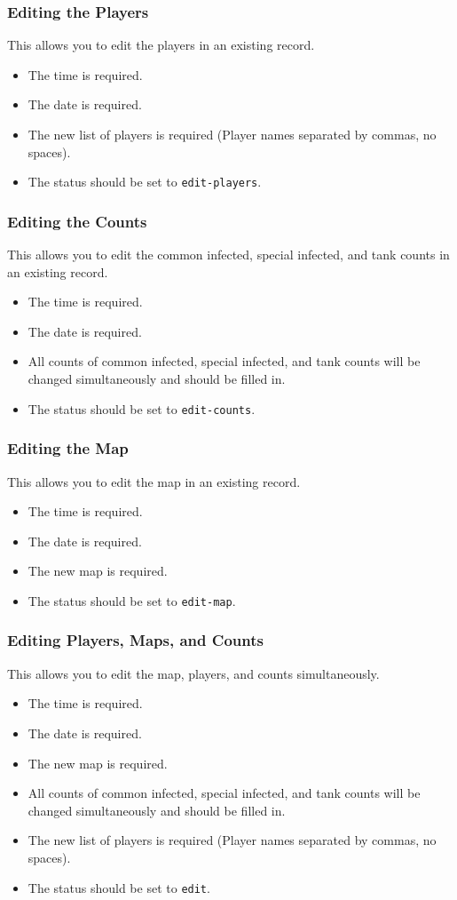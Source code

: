 \subsubsection{Editing the Players}
This allows you to edit the players in an existing record.
\begin{itemize}
\item The time is required.
\item The date is required.
\item The new list of players is required (Player names separated by commas, no spaces).
\item The status should be set to \texttt{edit-players}.
\end{itemize}

\subsubsection{Editing the Counts}
This allows you to edit the common infected, special infected, and tank counts in an existing record.
\begin{itemize}
\item The time is required.
\item The date is required.
\item All counts of common infected, special infected, and tank counts will be changed simultaneously and should be filled in.
\item The status should be set to \texttt{edit-counts}.
\end{itemize}

\subsubsection{Editing the Map}
This allows you to edit the map in an existing record.
\begin{itemize}
\item The time is required.
\item The date is required.
\item The new map is required.
\item The status should be set to \texttt{edit-map}.
\end{itemize}

\subsubsection{Editing Players, Maps, and Counts}
This allows you to edit the map, players, and counts simultaneously.
\begin{itemize}
\item The time is required.
\item The date is required.
\item The new map is required.
\item All counts of common infected, special infected, and tank counts will be changed simultaneously and should be filled in.
\item The new list of players is required (Player names separated by commas, no spaces).
\item The status should be set to \texttt{edit}.
\end{itemize}

